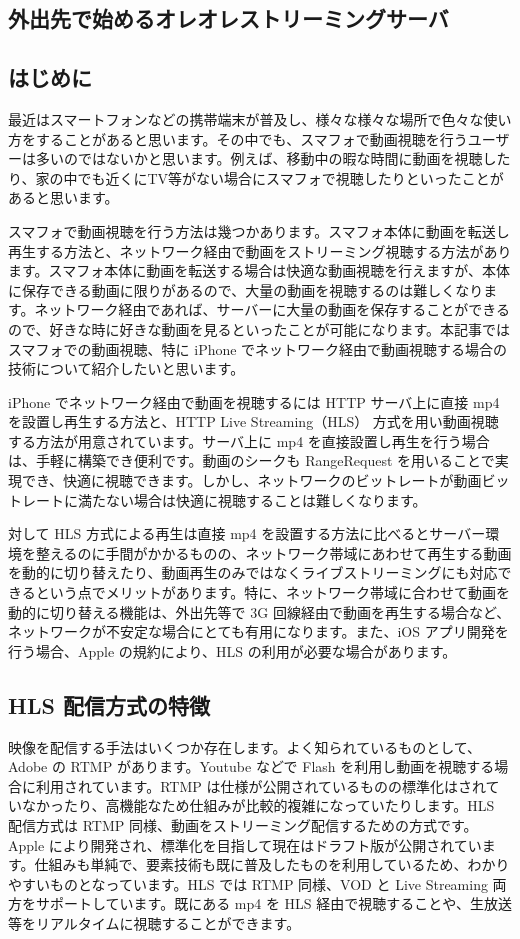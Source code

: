\subsection{外出先で始めるオレオレストリーミングサーバ}

\subsection{はじめに}
 最近はスマートフォンなどの携帯端末が普及し、様々な様々な場所で色々な使い方をすることがあると思います。その中でも、スマフォで動画視聴を行うユーザーは多いのではないかと思います。例えば、移動中の暇な時間に動画を視聴したり、家の中でも近くにTV等がない場合にスマフォで視聴したりといったことがあると思います。

 スマフォで動画視聴を行う方法は幾つかあります。スマフォ本体に動画を転送し再生する方法と、ネットワーク経由で動画をストリーミング視聴する方法があります。スマフォ本体に動画を転送する場合は快適な動画視聴を行えますが、本体に保存できる動画に限りがあるので、大量の動画を視聴するのは難しくなります。ネットワーク経由であれば、サーバーに大量の動画を保存することができるので、好きな時に好きな動画を見るといったことが可能になります。本記事ではスマフォでの動画視聴、特に iPhone でネットワーク経由で動画視聴する場合の技術について紹介したいと思います。

 iPhone でネットワーク経由で動画を視聴するには HTTP サーバ上に直接 mp4 を設置し再生する方法と、HTTP Live Streaming（HLS） 方式を用い動画視聴する方法が用意されています。サーバ上に mp4 を直接設置し再生を行う場合は、手軽に構築でき便利です。動画のシークも RangeRequest を用いることで実現でき、快適に視聴できます。しかし、ネットワークのビットレートが動画ビットレートに満たない場合は快適に視聴することは難しくなります。

 対して HLS 方式による再生は直接 mp4 を設置する方法に比べるとサーバー環境を整えるのに手間がかかるものの、ネットワーク帯域にあわせて再生する動画を動的に切り替えたり、動画再生のみではなくライブストリーミングにも対応できるという点でメリットがあります。特に、ネットワーク帯域に合わせて動画を動的に切り替える機能は、外出先等で 3G 回線経由で動画を再生する場合など、ネットワークが不安定な場合にとても有用になります。また、iOS アプリ開発を行う場合、Apple の規約により、HLS の利用が必要な場合があります。

\subsection{HLS 配信方式の特徴}
 映像を配信する手法はいくつか存在します。よく知られているものとして、Adobe の RTMP があります。Youtube などで Flash を利用し動画を視聴する場合に利用されています。RTMP は仕様が公開されているものの標準化はされていなかったり、高機能なため仕組みが比較的複雑になっていたりします。HLS 配信方式は RTMP 同様、動画をストリーミング配信するための方式です。Apple により開発され、標準化を目指して現在はドラフト版が公開されています。仕組みも単純で、要素技術も既に普及したものを利用しているため、わかりやすいものとなっています。HLS では RTMP 同様、VOD と Live Streaming 両方をサポートしています。既にある mp4 を HLS 経由で視聴することや、生放送等をリアルタイムに視聴することができます。

